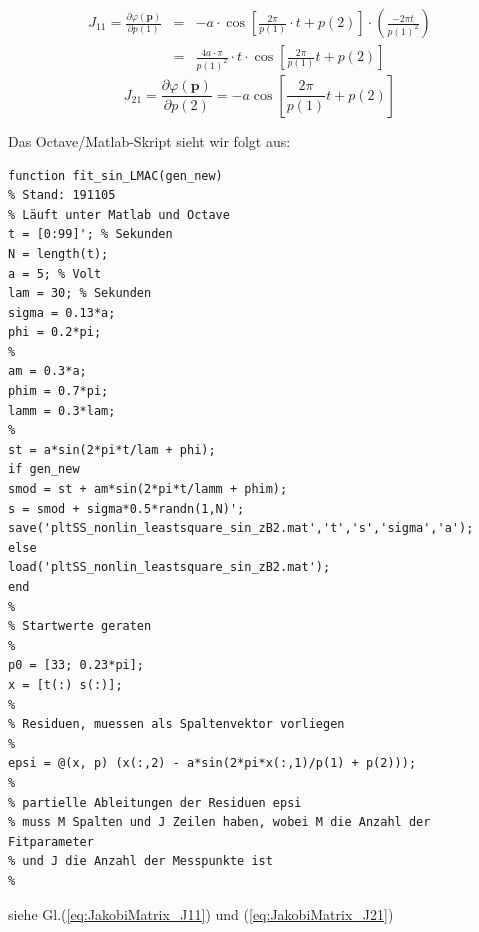 \begin{eqnarray}
 \nonumber J_{11} = \frac{\partial\varphi(\boldsymbol{p})}{\partial p(1)} &=& 
	- a\cdot \cos \left[ \frac{2\pi}{p(1)} \cdot t +p(2) \right] \cdot 
	\left(\frac{-2\pi t}{p(1)^2} \right) \\
	&=& \frac{4a\cdot \pi}{p(1)^2}\cdot t \cdot \cos \left[\frac{2 \pi}{p(1)} t +p(2) \right] 
	\label{eq:JakobiMatrix_J11}
\end{eqnarray}
\begin{equation}
	J_{21} = \frac{\partial\varphi(\boldsymbol{p})}{\partial p(2)} = - a \cos \left[ 
	\frac{2 \pi}{p(1)} t + p(2) \right] 
		\label{eq:JakobiMatrix_J21}
\end{equation}

 Das Octave/Matlab-Skript sieht wir folgt aus:

\begin{verbatim}
function fit_sin_LMAC(gen_new)
% Stand: 191105
% Läuft unter Matlab und Octave
t = [0:99]'; % Sekunden
N = length(t);
a = 5; % Volt
lam = 30; % Sekunden
sigma = 0.13*a;
phi = 0.2*pi;
%
am = 0.3*a;
phim = 0.7*pi;
lamm = 0.3*lam;
%
st = a*sin(2*pi*t/lam + phi);
if gen_new
smod = st + am*sin(2*pi*t/lamm + phim);
s = smod + sigma*0.5*randn(1,N)';
save('pltSS_nonlin_leastsquare_sin_zB2.mat','t','s','sigma','a');
else
load('pltSS_nonlin_leastsquare_sin_zB2.mat');
end
%
% Startwerte geraten
%
p0 = [33; 0.23*pi];
x = [t(:) s(:)];
%
% Residuen, muessen als Spaltenvektor vorliegen
%
epsi = @(x, p) (x(:,2) - a*sin(2*pi*x(:,1)/p(1) + p(2)));
%
% partielle Ableitungen der Residuen epsi
% muss M Spalten und J Zeilen haben, wobei M die Anzahl der Fitparameter
% und J die Anzahl der Messpunkte ist
%
\end{verbatim}
siehe Gl.(\ref{eq:JakobiMatrix_J11}) und (\ref{eq:JakobiMatrix_J21})
